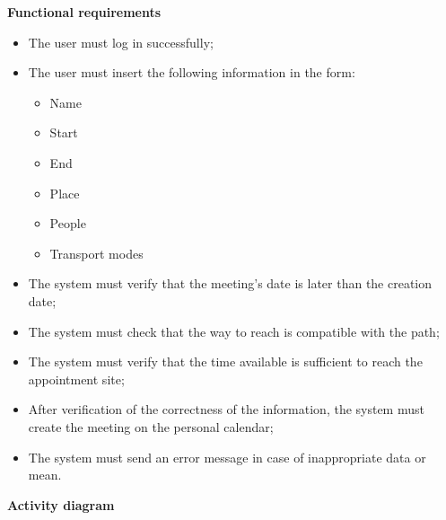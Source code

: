 \documentclass{article}
\begin{document}
	\bigskip
	\noindent
	\newpage
	\textbf{Functional requirements} \\
	\begin{itemize}
		\item The user must log in successfully;
		\item The user must insert the following information in the form:
			\begin{itemize}
				\item Name
				\item Start
				\item End
				\item Place
				\item People
				\item Transport modes
			\end{itemize}
		\item The system must verify that the meeting's date is later than the creation date;
		\item The system must check that the way to reach is compatible with the path;
		\item The system must verify that the time available is sufficient to reach the appointment site;
		\item After verification of the correctness of the information, the system must create the meeting on the personal calendar;
		\item The system must send an error message in case of inappropriate data or mean.
	\end{itemize}
	
	\newpage
	\noindent
	\textbf{Activity diagram} \\
	
\end{document}
